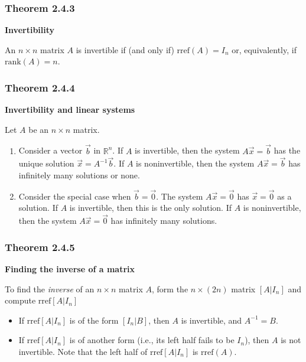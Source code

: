 \documentclass{report}
\begin{document}
\subsubsection*{Theorem 2.4.3}
\par\noindent\textbf{Invertibility}
\par\noindent An $n\times{}n$ matrix $A$ is invertible if (and only if) $\textrm{rref}(A)=I_{n}$ or, equivalently, if $\textrm{rank}(A)=n$.
\subsubsection*{Theorem 2.4.4}
\par\noindent\textbf{Invertibility and linear systems}
\par\noindent Let $A$ be an $n\times{}n$ matrix.
\renewcommand{\labelenumi}{\textbf{\alph{enumi}.}}
\begin{enumerate}
\item Consider a vector $\vec{b}$ in $\mathbb{R}^{n}$. If $A$ is invertible, then the system $A\vec{x}=\vec{b}$ has the unique solution $\vec{x}=A^{-1}\vec{b}$. If $A$ is noninvertible, then the system $A\vec{x}=\vec{b}$ has infinitely many solutions or none.
\item Consider the special case when $\vec{b}=\vec{0}$. The system $A\vec{x}=\vec{0}$ has $\vec{x}=\vec{0}$ as a solution. If $A$ is invertible, then this is the only solution. If $A$ is noninvertible, then the system $A\vec{x}=\vec{0}$ has infinitely many solutions.
\end{enumerate}
\subsubsection*{Theorem 2.4.5}
\par\noindent\textbf{Finding the inverse of a matrix}
\par\noindent To find the \textit{inverse} of an $n\times{}n$ matrix $A$, form the $n\times{}(2n)$ matrix $\left[A|I_{n}\right]$ and compute $\textrm{rref}\left[A|I_{n}\right]$
\begin{itemize}
\item If $\textrm{rref}\left[A|I_{n}\right]$ is of the form $\left[I_{n}|B\right]$, then $A$ is invertible, and $A^{-1}=B$.
\item If $\textrm{rref}\left[A|I_{n}\right]$ is of another form (i.e., its left half fails to be $I_{n}$), then $A$ is not invertible. Note that the left half of $\textrm{rref}\left[A|I_{n}\right]$ is $\textrm{rref}(A)$.
\end{itemize}
\end{document}
